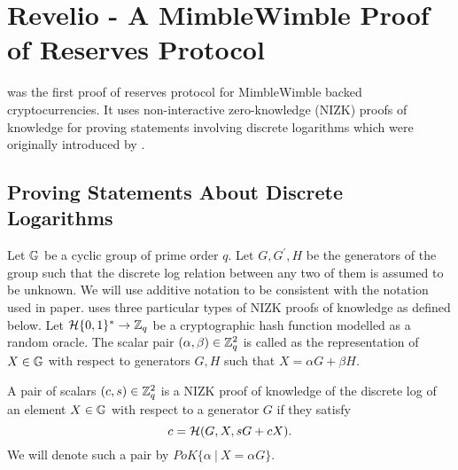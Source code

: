 \section{\textnormal{{\selectfont Revelio}} - A MimbleWimble Proof of Reserves Protocol}
\label{scn:revelio}

\R \cite{Dutta2019b} was the first proof of reserves protocol for MimbleWimble backed cryptocurrencies.
It uses non-interactive zero-knowledge (NIZK) proofs of knowledge for proving statements involving discrete logarithms which were originally introduced by \cite{Camenisch1997}.





\subsection{Proving Statements About Discrete Logarithms}

Let $\mathbb{G}$ be a cyclic group of prime order $q$. Let $G, G^{\prime}, H$ be the generators of the group such that the discrete log relation between any two of them is assumed to be unknown.
We will use additive notation to be consistent with the notation used in \R paper.
\R uses three particular types of NIZK proofs of knowledge as defined below.
Let $\mathcal{H} \{0,1\}^{*} \rightarrow \mathbb{Z}_q $ be a cryptographic hash function modelled as a random oracle. 
The scalar pair $(\alpha, \beta) \in \mathbb{Z}_q^2$ is called as the representation of $X \in \mathbb{G}$ with respect to generators $G,H$ such that $X = \alpha G + \beta H$.
\begin{definition}
    A pair of scalars $(c,s) \in \mathbb{Z}_q^2$ is a NIZK proof of knowledge of the discrete log of an element $X \in \mathbb{G}$ with respect to a generator $G$ if they satisfy
    $$ c = \mathcal{H}(G,X,sG + cX). $$We will denote such a pair by $PoK\{\alpha \ | \ X = \alpha G \}$.
\end{definition}

